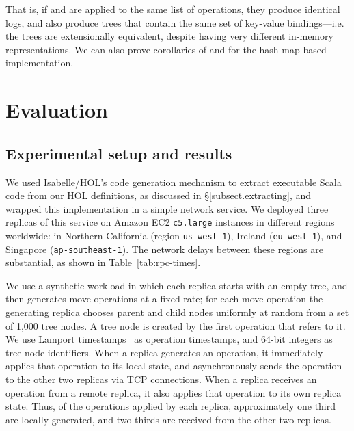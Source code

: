\documentclass[sigplan,anonymous]{acmart}
\begin{document}
That is, if  and  are applied to the same list of operations, they produce identical logs, and also produce trees that contain the same set of key-value bindings---i.e. the trees are extensionally equivalent, despite having very different in-memory representations.
We can also prove corollaries of  and  for the hash-map-based implementation.

\section{Evaluation}\label{sec:evaluation}

\subsection{Experimental setup and results}

We used Isabelle/HOL's code generation mechanism to extract executable Scala code from our HOL definitions, as discussed in \S\ref{subsect.extracting}, and wrapped this implementation in a simple network service.
We deployed three replicas of this service on Amazon EC2 \texttt{c5.large} instances in different regions worldwide: in Northern California (region \texttt{us-west-1}), Ireland (\texttt{eu-west-1}), and Singapore (\texttt{ap-southeast-1}).
The network delays between these regions are substantial, as shown in Table~\ref{tab:rpc-times}.

We use a synthetic workload in which each replica starts with an empty tree, and then generates move operations at a fixed rate; for each move operation the generating replica chooses parent and child nodes uniformly at random from a set of 1,000 tree nodes.
A tree node is created by the first operation that refers to it.
We use Lamport timestamps~\cite{Lamport:1978jq} as operation timestamps, and 64-bit integers as tree node identifiers.
When a replica generates an operation, it immediately applies that operation to its local state, and asynchronously sends the operation to the other two replicas via TCP connections.
When a replica receives an operation from a remote replica, it also applies that operation to its own replica state.
Thus, of the operations applied by each replica, approximately one third are locally generated, and two thirds are received from the other two replicas.
\end{document}
